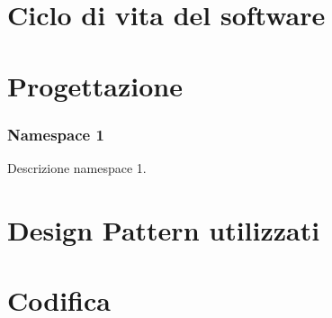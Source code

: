 \section{Ciclo di vita del software}
\label{sec:ciclo-vita-software}

\section{Progettazione}
\label{sec:progettazione}

\subsubsection{Namespace 1}
Descrizione namespace 1.

\begin{namespacedesc}
\end{namespacedesc}

\section{Design Pattern utilizzati}

\section{Codifica}
